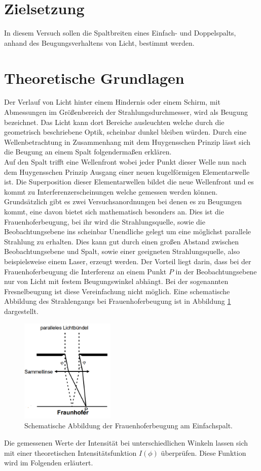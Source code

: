 \section{Zielsetzung}
In diesem Versuch sollen die Spaltbreiten eines Einfach- und Doppelspalts, anhand des Beugungsverhaltens von Licht, bestimmt werden.

\section{Theoretische Grundlagen}
Der Verlauf von Licht hinter einem Hindernis oder einem Schirm, mit Abmessungen im Größenbereich der Strahlungsdurchmesser, wird als Beugung bezeichnet. Das Licht kann dort Bereiche ausleuchten welche durch die geometrisch beschriebene Optik, scheinbar dunkel bleiben würden. Durch eine Wellenbetrachtung in Zusammenhang mit dem Huygensschen Prinzip lässt sich die Beugung an einem Spalt folgendermaßen erklären. 
\\
\newline
Auf den Spalt trifft eine Wellenfront wobei jeder Punkt dieser Welle nun nach dem Huygensschen Prinzip Ausgang einer neuen kugelförmigen Elementarwelle ist. Die Superposition dieser Elementarwellen bildet die neue Wellenfront und es kommt zu Interferenzerscheinungen welche gemessen werden können.
\\
\newline
Grundsätzlich gibt es zwei Versuchsanordnungen bei denen es zu Beugungen kommt, eine davon bietet sich mathematisch besonders an. Dies ist die Frauenhoferbeugung, bei ihr wird die Strahlungsquelle, sowie die Beobachtungsebene ins scheinbar Unendliche gelegt um eine möglichst parallele Strahlung zu erhalten. Dies kann gut durch einen großen Abstand zwischen Beobachtungsebene und Spalt, sowie einer geeigneten Strahlungsquelle, also beispielsweise einem Laser, erzeugt werden. Der Vorteil liegt darin, dass bei der Frauenhoferbeugung die Interferenz an einem Punkt $P$ in der Beobachtungsebene nur von Licht mit festem Beugungswinkel abhängt. Bei der sogenannten Fresnelbeugung ist diese Vereinfachung nicht möglich. Eine schematische Abbildung des Strahlengangs bei Frauenhoferbeugung ist in Abbildung \ref{fig:fig1} dargestellt.
\begin{figure}
    \centering
    \includegraphics[width=0.4\textwidth]{bilder/1.png}
    \caption{Schematische Abbildung der Frauenhoferbeugung am Einfachspalt. \cite{skript}} 
    \label{fig:fig1}
\end{figure}
Die gemessenen Werte der Intensität bei unterschiedlichen Winkeln lassen sich mit einer theoretischen Intensitätsfunktion $I(\phi)$ überprüfen. Diese Funktion wird im Folgenden erläutert.

